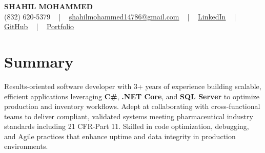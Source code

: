 \documentclass[letterpaper,10pt]{article}
\begin{document}
\begin{center}
    {\fontsize{14pt}{12pt}\selectfont \textbf{\MakeUppercase{Shahil Mohammed}}}\\ \vspace{2pt}
    \fontsize{10pt}{12pt}\selectfont (832) 620-5379 ~ | ~ \href{mailto:shahilmohammed14786@gmail.com}{shahilmohammed14786@gmail.com} ~ | ~  
    \href{https://www.linkedin.com/in/shahil-mohammed-9652931a1/}{\color{blue}\underline{LinkedIn}}  ~ | ~ 
    \href{https://github.com/freakbeast14}{\color{blue}\underline{GitHub}} ~ | ~ 
    \href{https://shahil-mohammed.netlify.app/}{\color{blue}\underline{Portfolio}}
    \vspace{-8pt}
\end{center}

\section{Summary}
\vspace{-2pt}\fontsize{8pt}{9pt}\selectfont
Results-oriented software developer with 3+ years of experience building scalable, efficient applications leveraging \textbf{C\#}, \textbf{.NET Core}, and \textbf{SQL Server} to optimize production and inventory workflows. Adept at collaborating with cross-functional teams to deliver compliant, validated systems meeting pharmaceutical industry standards including 21 CFR-Part 11. Skilled in code optimization, debugging, and Agile practices that enhance uptime and data integrity in production environments.
 \vspace{-5pt}
 
\vspace{-2pt}
\end{document}
